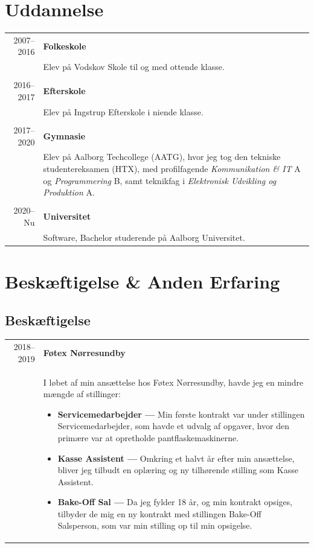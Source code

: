 \documentclass{article}
\begin{document}
    \section*{Uddannelse}
    \begin{tabular}{r|p{.82\linewidth}} 
        2007--2016 & \textbf{Folkeskole}\\
    &   Elev på Vodskov Skole til og med ottende klasse.
        \\\\
        2016--2017 & \textbf{Efterskole}\\
    &   Elev på Ingstrup Efterskole i niende klasse.
        \\\\
        2017--2020 & \textbf{Gymnasie}\\
    &   Elev på Aalborg Techcollege (AATG), hvor jeg tog den tekniske studentereksamen (HTX),
        med profilfagende \textit{Kommunikation \& IT} A og \textit{Programmering} B, samt teknikfag i \textit{Elektronisk Udvikling og Produktion} A.
        \\\\
        2020--Nu & \textbf{Universitet}\\
    &   Software, Bachelor studerende på Aalborg Universitet.
    \end{tabular}
 
    \section*{Beskæftigelse \& Anden Erfaring}
    \subsection*{Beskæftigelse}
    \begin{tabular}{r|p{.82\linewidth}}%
        2018--2019 & \textbf{Føtex Nørresundby}\\
    &   I løbet af min ansættelse hos Føtex Nørresundby, havde jeg en mindre mængde af stillinger:
        \begin{itemize}\setlength\itemsep{0em}
            \item[] \textbf{Servicemedarbejder --- } Min første kontrakt var under stillingen 
                Servicemedarbejder, som havde et udvalg af opgaver, hvor den primære var at
                opretholde pantflaskemaskinerne.
            \item[] \textbf{Kasse Assistent --- } Omkring et halvt år efter min ansættelse, bliver
                jeg tilbudt en oplæring og ny tilhørende stilling som Kasse Assistent.
            \item[] \textbf{Bake-Off Sal --- } Da jeg fylder 18 år, og min kontrakt opsiges,
                tilbyder de mig en ny kontrakt med stillingen Bake-Off Salsperson, som var min stilling
                op til min opsigelse.
        \end{itemize}
    \end{tabular}
\end{document}
